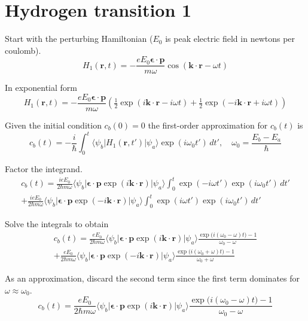 

\section*{Hydrogen transition 1}

Start with the perturbing Hamiltonian ($E_0$ is peak electric field in newtons per coulomb).
\begin{equation*}
H_1(\mathbf r,t)=-\frac{eE_0\boldsymbol{\epsilon}\cdot\mathbf p}{m\omega}
\cos(\mathbf k\cdot\mathbf r-\omega t)
\end{equation*}

In exponential form
\begin{equation*}
H_1(\mathbf r,t)=-\frac{eE_0\boldsymbol{\epsilon}\cdot\mathbf p}{m\omega}
\left(\tfrac{1}{2}\exp(i\mathbf k\cdot\mathbf r-i\omega t)
+\tfrac{1}{2}\exp(-i\mathbf k\cdot\mathbf r+i\omega t)\right)
\end{equation*}

Given the initial condition $c_b(0)=0$ the first-order approximation for $c_b(t)$ is
\begin{equation*}
c_b(t)=-\frac{i}{\hbar}\int_0^t
\langle\psi_b|H_1(\mathbf r,t')|\psi_a\rangle\exp(i\omega_0t')\,dt',\quad
\omega_0=\frac{E_b-E_a}{\hbar}
\end{equation*}

Factor the integrand.
\begin{multline*}
c_b(t)
=\frac{ieE_0}{2\hbar m\omega}
\langle\psi_b|\boldsymbol{\epsilon}\cdot\mathbf p\exp(i\mathbf k\cdot\mathbf r)|\psi_a\rangle
\int_0^t\exp(-i\omega t')\exp(i\omega_0t')\,dt'
\\
+\frac{ieE_0}{2\hbar m\omega}
\langle\psi_b|\boldsymbol{\epsilon}\cdot\mathbf p\exp(-i\mathbf k\cdot\mathbf r)|\psi_a\rangle
\int_0^t\exp(i\omega t')\exp(i\omega_0t')\,dt'
\end{multline*}

Solve the integrals to obtain
\begin{multline*}
c_b(t)=\frac{eE_0}{2\hbar m\omega}
\langle\psi_b|\boldsymbol{\epsilon}\cdot\mathbf p\exp(i\mathbf k\cdot\mathbf r)|\psi_a\rangle
\frac{\exp\bigl(i(\omega_0-\omega)t\bigr)-1}{\omega_0-\omega}
\\
+\frac{eE_0}{2\hbar m\omega}
\langle\psi_b|\boldsymbol{\epsilon}\cdot\mathbf p\exp(-i\mathbf k\cdot\mathbf r)|\psi_a\rangle
\frac{\exp\bigl(i(\omega_0+\omega)t\bigr)-1}{\omega_0+\omega}
\tag{1}
\end{multline*}

As an approximation, discard the second term since the first term
dominates for $\omega\approx\omega_0$.
\begin{equation*}
c_b(t)=\frac{eE_0}{2\hbar m\omega}
\langle\psi_b|\boldsymbol{\epsilon}\cdot\mathbf p\exp(i\mathbf k\cdot\mathbf r)|\psi_a\rangle
\frac{\exp\bigl(i(\omega_0-\omega)t\bigr)-1}{\omega_0-\omega}
\end{equation*}

